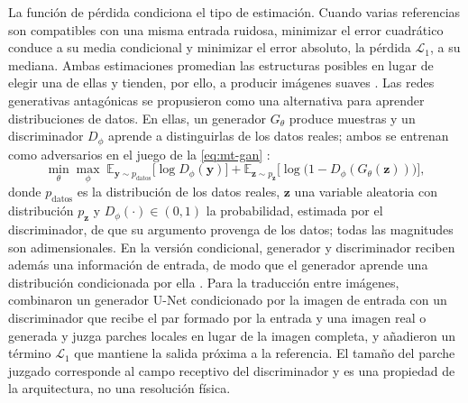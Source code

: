 La función de pérdida condiciona el tipo de estimación. Cuando varias referencias son compatibles con una misma entrada ruidosa, minimizar el error cuadrático conduce a su media condicional y minimizar el error absoluto, la pérdida $\mathcal L_1$, a su mediana. Ambas estimaciones promedian las estructuras posibles en lugar de elegir una de ellas y tienden, por ello, a producir imágenes suaves \parencite{isola2017}. Las redes generativas antagónicas se propusieron como una alternativa para aprender distribuciones de datos. En ellas, un generador $G_\theta$ produce muestras y un discriminador $D_\phi$ aprende a distinguirlas de los datos reales; ambos se entrenan como adversarios en el juego de la \cref{eq:mt-gan} \parencite{goodfellow2014}:
\begin{equation}\label{eq:mt-gan}
\min_{\theta}\max_{\phi}\;\mathbb E_{\boldsymbol y\sim p_{\mathrm{datos}}}\big[\log D_\phi(\boldsymbol y)\big]+\mathbb E_{\boldsymbol z\sim p_{\boldsymbol z}}\big[\log\big(1-D_\phi(G_\theta(\boldsymbol z))\big)\big],
\end{equation}
donde $p_{\mathrm{datos}}$ es la distribución de los datos reales, $\boldsymbol z$ una variable aleatoria con distribución $p_{\boldsymbol z}$ y $D_\phi(\cdot)\in(0,1)$ la probabilidad, estimada por el discriminador, de que su argumento provenga de los datos; todas las magnitudes son adimensionales. En la versión condicional, generador y discriminador reciben además una información de entrada, de modo que el generador aprende una distribución condicionada por ella \parencite{mirza2014}. Para la traducción entre imágenes, \textcite{isola2017} combinaron un generador U-Net condicionado por la imagen de entrada con un discriminador que recibe el par formado por la entrada y una imagen real o generada y juzga parches locales en lugar de la imagen completa, y añadieron un término $\mathcal L_1$ que mantiene la salida próxima a la referencia. El tamaño del parche juzgado corresponde al campo receptivo del discriminador y es una propiedad de la arquitectura, no una resolución física.

